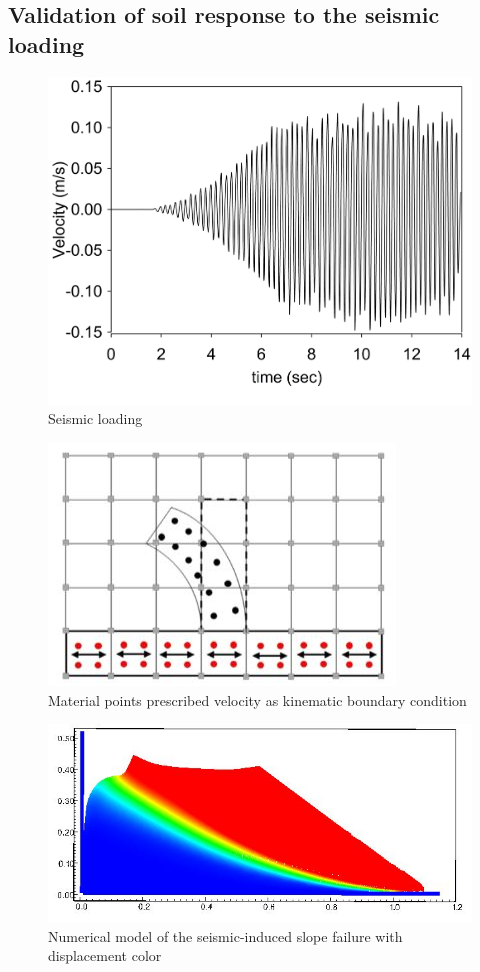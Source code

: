 \documentclass[preprint,12pt]{elsarticle}
\begin{document}
\subsection{\textsf{Validation of soil response to the seismic loading}}
%
%
\begin{figure}[H]
\center
\includegraphics[scale=0.25]{vel.jpg}
\caption{Seismic loading}
\label{fig:vel_profile}
\end {figure}
%
%
\begin{figure}[H]
\center
\includegraphics[scale=0.75]{MPM_seismic.jpg}
\caption{Material points prescribed velocity as kinematic boundary condition \cite{Alsardi}}
\label{fig:seismic_method}
\end {figure}
%
%
%
%
\begin{figure}[H]
\center
\includegraphics[scale=0.75]{seismic.jpg}
\caption{Numerical model of the seismic-induced slope failure with displacement color}
\label{fig:seismic}
\end {figure}
\end{document}
